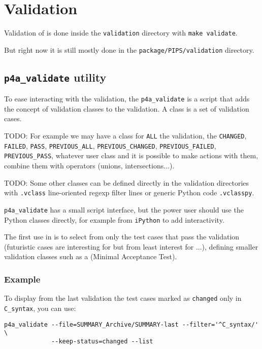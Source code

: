 \documentclass[a4paper]{article}
\begin{document}
\section{Validation}
\label{sec:validation}


Validation of \Apfa is done inside the \texttt{validation} directory with
\texttt{make validate}.

But right now it is still mostly done in the
\texttt{package/PIPS/validation} directory.


\subsection{\protect\texttt{p4a\_validate} utility}
\label{sec:p4a_validate-utility}


To ease interacting with the validation, the \verb|p4a_validate| is a
script that adds the concept of validation classes to the \Apips
validation. A class is a set of validation cases.

TODO: For example we may have a class for \texttt{ALL} the validation, the
\texttt{CHANGED}, \texttt{FAILED}, \texttt{PASS}, \verb|PREVIOUS_ALL|,
\verb|PREVIOUS_CHANGED|, \verb|PREVIOUS_FAILED|, \verb|PREVIOUS_PASS|,
whatever user class and it is possible to make actions with them, combine
them with operators (unions, intersections...).

TODO: Some other classes can be defined directly in the validation
directories with \texttt{.vclass} line-oriented regexp filter lines or
generic Python code \texttt{.vclasspy}.

\verb|p4a_validate| has a small script interface, but the power user
should use the Python classes directly, for example from \texttt{iPython}
to add interactivity.

The first use in \Apfa is to select from \Apips only the test cases that
pass the validation (futuristic cases are interesting for \Apips but from
least interest for \Apfa...), defining smaller validation classes such as
a \Amat (Minimal Acceptance Test).


\subsubsection{Example}
\label{sec:example}

To display from the last validation the test cases marked as
\texttt{changed} only in \verb|C_syntax|, you can use:
\begin{verbatim}
p4a_validate --file=SUMMARY_Archive/SUMMARY-last --filter='^C_syntax/' \
             --keep-status=changed --list
\end{verbatim}
\end{document}
